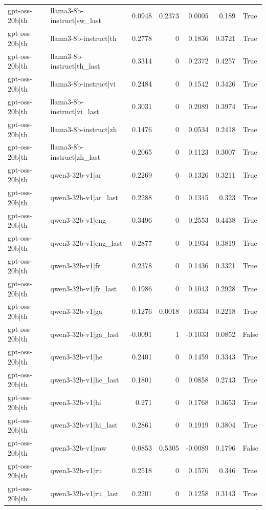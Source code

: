 \begin{table}
\begin{tabular}{l l r r r r l}
gpt-oss-20b|th & llama3-8b-instruct|sw_last & 0.0948 & 0.2373 & 0.0005 & 0.189 & True \\
gpt-oss-20b|th & llama3-8b-instruct|th & 0.2778 & 0 & 0.1836 & 0.3721 & True \\
gpt-oss-20b|th & llama3-8b-instruct|th_last & 0.3314 & 0 & 0.2372 & 0.4257 & True \\
gpt-oss-20b|th & llama3-8b-instruct|vi & 0.2484 & 0 & 0.1542 & 0.3426 & True \\
gpt-oss-20b|th & llama3-8b-instruct|vi_last & 0.3031 & 0 & 0.2089 & 0.3974 & True \\
gpt-oss-20b|th & llama3-8b-instruct|zh & 0.1476 & 0 & 0.0534 & 0.2418 & True \\
gpt-oss-20b|th & llama3-8b-instruct|zh_last & 0.2065 & 0 & 0.1123 & 0.3007 & True \\
gpt-oss-20b|th & qwen3-32b-v1|ar & 0.2269 & 0 & 0.1326 & 0.3211 & True \\
gpt-oss-20b|th & qwen3-32b-v1|ar_last & 0.2288 & 0 & 0.1345 & 0.323 & True \\
gpt-oss-20b|th & qwen3-32b-v1|eng & 0.3496 & 0 & 0.2553 & 0.4438 & True \\
gpt-oss-20b|th & qwen3-32b-v1|eng_last & 0.2877 & 0 & 0.1934 & 0.3819 & True \\
gpt-oss-20b|th & qwen3-32b-v1|fr & 0.2378 & 0 & 0.1436 & 0.3321 & True \\
gpt-oss-20b|th & qwen3-32b-v1|fr_last & 0.1986 & 0 & 0.1043 & 0.2928 & True \\
gpt-oss-20b|th & qwen3-32b-v1|ga & 0.1276 & 0.0018 & 0.0334 & 0.2218 & True \\
gpt-oss-20b|th & qwen3-32b-v1|ga_last & -0.0091 & 1 & -0.1033 & 0.0852 & False \\
gpt-oss-20b|th & qwen3-32b-v1|he & 0.2401 & 0 & 0.1459 & 0.3343 & True \\
gpt-oss-20b|th & qwen3-32b-v1|he_last & 0.1801 & 0 & 0.0858 & 0.2743 & True \\
gpt-oss-20b|th & qwen3-32b-v1|hi & 0.271 & 0 & 0.1768 & 0.3653 & True \\
gpt-oss-20b|th & qwen3-32b-v1|hi_last & 0.2861 & 0 & 0.1919 & 0.3804 & True \\
gpt-oss-20b|th & qwen3-32b-v1|raw & 0.0853 & 0.5305 & -0.0089 & 0.1796 & False \\
gpt-oss-20b|th & qwen3-32b-v1|ru & 0.2518 & 0 & 0.1576 & 0.346 & True \\
gpt-oss-20b|th & qwen3-32b-v1|ru_last & 0.2201 & 0 & 0.1258 & 0.3143 & True \\

\end{tabular}
\end{table}
